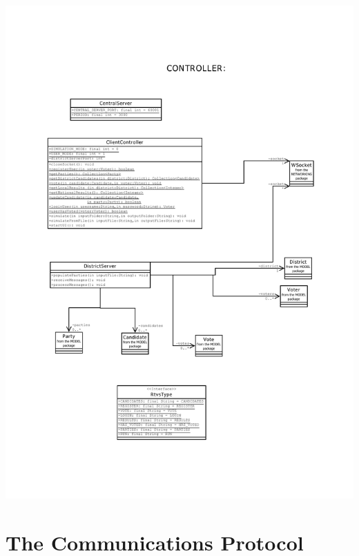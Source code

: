 \documentclass[11pt,english]{article}
\begin{document}
\includegraphics[width=6.2in]{figures/uml4.pdf} \\


\section{The Communications Protocol}
\end{document}
